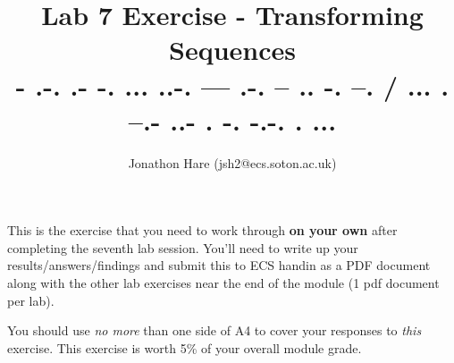 \documentclass[a4paper]{article}
\begin{document}
\lstset{language=Python,upquote=true}

\setlength{\leftskip}{20pt}
\title{Lab 7 Exercise - Transforming Sequences\\- .-. .- -. ... ..-. --- .-. -- .. -. --. / ... . --.- ..- . -. -.-. . ...}
\author{Jonathon Hare (jsh2@ecs.soton.ac.uk)}

\maketitle


This is the exercise that you need to work through \textbf{on your own} after completing the seventh lab session. You'll need to write up your results/answers/findings and submit this to ECS handin as a PDF document along with the other lab exercises near the end of the module (1 pdf document per lab). 

You should use \emph{no more} than one side of A4 to cover your responses to \emph{this} exercise. This exercise is worth 5\% of your overall module grade.
\end{document}
